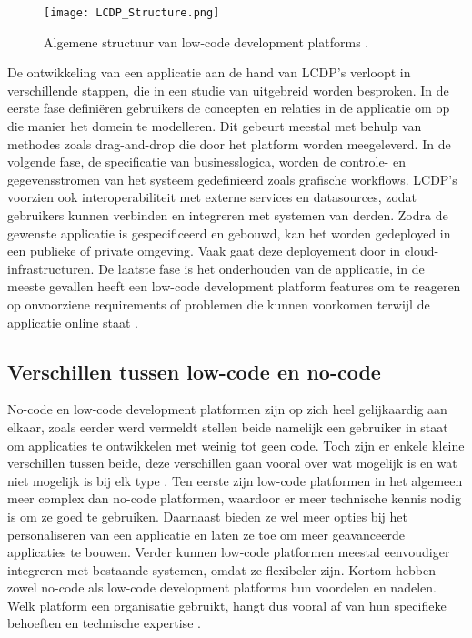 \begin{figure}[hb]
    \centering
    \texttt{[image: LCDP\_Structure.png]}
    \caption[Structuur low-code platforms]{Algemene structuur van low-code development platforms \autocite{Sahay2020}.}
    \label{fig:lcdp_structure}
\end{figure}

De ontwikkeling van een applicatie aan de hand van LCDP's verloopt in verschillende stappen, die in een studie van \textcite{Ruscio2022} uitgebreid worden besproken. In de eerste fase definiëren gebruikers de concepten en relaties in de applicatie om op die manier het domein te modelleren. Dit gebeurt meestal met behulp van methodes zoals drag-and-drop die door het platform worden meegeleverd. In de volgende fase, de specificatie van businesslogica, worden de controle- en gegevensstromen van het systeem gedefinieerd zoals grafische workflows. LCDP's voorzien ook interoperabiliteit met externe services en datasources, zodat gebruikers kunnen verbinden en integreren met systemen van derden. Zodra de gewenste applicatie is gespecificeerd en gebouwd, kan het worden gedeployed in een publieke of private omgeving. Vaak gaat deze deployement door in cloud-infrastructuren. De laatste fase is het onderhouden van de applicatie, in de meeste gevallen heeft een low-code development platform features om te reageren op onvoorziene requirements of problemen die kunnen voorkomen terwijl de applicatie online staat . \\

\subsection{Verschillen tussen low-code en no-code}
\label{subsec:verschillen_low_code}

No-code en low-code development platformen zijn op zich heel gelijkaardig aan elkaar, zoals eerder werd vermeldt stellen beide namelijk een gebruiker in staat om applicaties te ontwikkelen met weinig tot geen code. Toch zijn er enkele kleine verschillen tussen beide, deze verschillen gaan vooral over wat mogelijk is en wat niet mogelijk is bij elk type \autocite{Yan2021}. Ten eerste zijn low-code platformen in het algemeen meer complex dan no-code platformen, waardoor er meer technische kennis nodig is om ze goed te gebruiken. Daarnaast bieden ze wel meer opties bij het personaliseren van een applicatie en laten ze toe om meer geavanceerde applicaties te bouwen. Verder kunnen low-code platformen meestal eenvoudiger integreren met bestaande systemen, omdat ze flexibeler zijn. Kortom hebben zowel no-code als low-code development platforms hun voordelen en nadelen. Welk platform een organisatie gebruikt, hangt dus vooral af van hun specifieke behoeften en technische expertise \autocite{Yan2021}.

